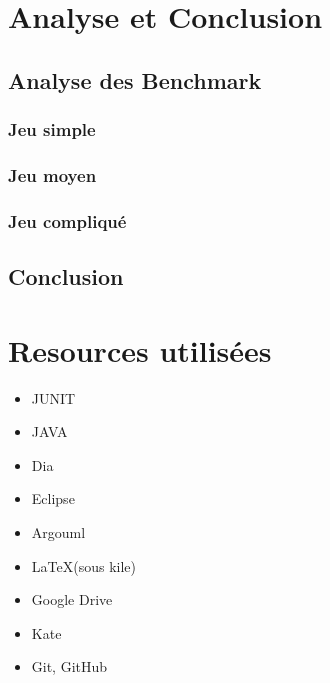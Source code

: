 ﻿\documentclass[a4paper,twoside,12pt]{report}
\begin{document}
\chapter{Analyse et Conclusion}
%
\section{Analyse des Benchmark}
%
\subsection{Jeu simple}
%
\subsection{Jeu moyen}
%
\subsection{Jeu compliqué}
%
\section{Conclusion}
%
\newpage
{}


\chapter{Resources utilisées}
\begin{itemize}
 \item JUNIT
 \item JAVA
 \item Dia
 \item Eclipse
 \item Argouml
 \item \LaTeX (sous kile)
 \item Google Drive
 \item Kate
 \item Git, GitHub
\end{itemize}
\end{document}
